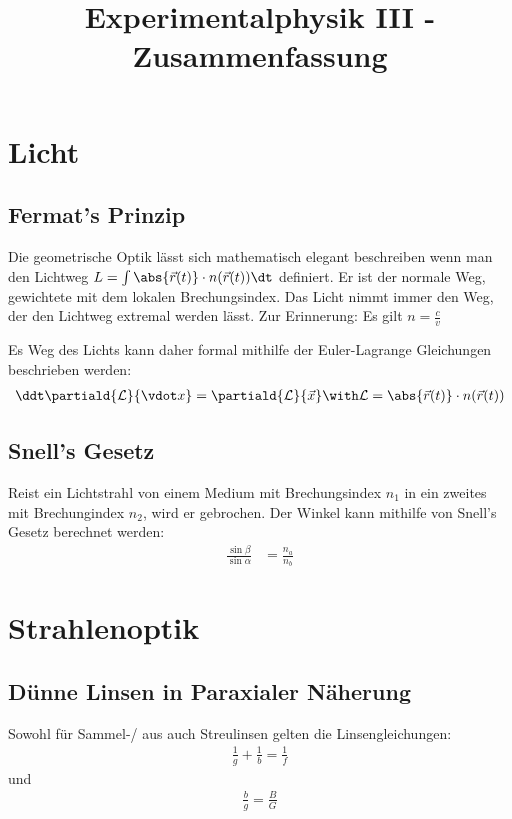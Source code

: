\documentclass[twocolumn]{summery}
\title{Experimentalphysik III - Zusammenfassung}
\begin{document}
\maketitle
\tableofcontents

\section{Licht}
\subsection{Fermat's Prinzip}
Die geometrische Optik lässt sich mathematisch elegant beschreiben wenn man den Lichtweg 
\(L = \int \abs{\vec r(t)}\cdot n(\vec r (t)) \dt\) definiert. Er ist der normale Weg, gewichtete 
mit dem lokalen Brechungsindex.
Das Licht nimmt immer den Weg, der den Lichtweg extremal werden lässt.
Zur Erinnerung: Es gilt \(n = \frac{c}{v}\)

Es Weg des Lichts kann daher formal mithilfe der Euler-Lagrange Gleichungen beschrieben werden:
\begin{align*}
    \ddt \partiald{\mathcal L}{\vdot x} = \partiald{\mathcal L}{\vec x} \with \mathcal L = \abs{\vec r(t)}\cdot n(\vec r (t))
\end{align*}

\subsection{Snell's Gesetz}
Reist ein Lichtstrahl von einem Medium mit Brechungsindex \(n_1\) in ein zweites mit 
Brechungindex \(n_2\), wird er gebrochen. Der Winkel kann mithilfe von Snell's Gesetz 
berechnet werden:
\begin{align*}
    \frac{\sin\beta}{\sin\alpha} &= \frac{n_a}{n_b}
\end{align*}

\section{Strahlenoptik}
\subsection{Dünne Linsen in Paraxialer Näherung}
Sowohl für Sammel-/ aus auch Streulinsen gelten die Linsengleichungen:
\begin{align*}
    \frac 1g + \frac 1b = \frac 1f
\end{align*}
und 
\begin{align*}
    \frac{b}{g} = \frac BG   
\end{align*}
\end{document}
